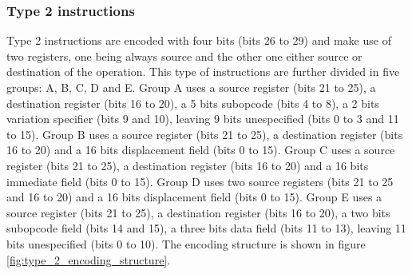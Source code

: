 \subsubsection{Type 2 instructions}
\label{sssec:type_2}
Type 2 instructions are encoded with four bits (bits 26 to 29) and make use of two registers, one being always source and the other one either source or
destination of the operation. This type of instructions are further divided in five groups: A, B, C, D and E. Group A uses a source register (bits 21 to
25), a destination register (bits 16 to 20), a 5 bits subopcode (bits 4 to 8), a 2 bits variation specifier (bits 9 and 10), leaving 9 bits unespecified
(bits 0 to 3 and 11 to 15). Group B uses a source register (bits 21 to 25), a destination register (bits 16 to 20) and a 16 bits displacement field (bits 0
to 15). Group C uses a source register (bits 21 to 25), a destination register (bits 16 to 20) and a 16 bits immediate field (bits 0 to 15). Group D uses
two source registers (bits 21 to 25 and 16 to 20) and a 16 bits displacement field (bits 0 to 15). Group E uses a source register (bits 21 to 25), a
destination register (bits 16 to 20), a two bits subopcode field (bits 14 and 15), a three bits data field (bits 11 to 13), leaving 11 bits unespecified
(bits 0 to 10). The encoding structure is shown in figure \ref{fig:type_2_encoding_structure}.

